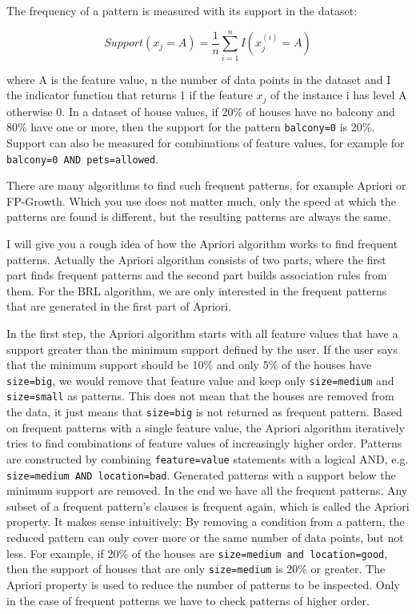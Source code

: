 \documentclass[12pt,]{krantz}
\begin{document}
The frequency of a pattern is measured with its support in the dataset:

\[Support(x_j=A)=\frac{1}n{}\sum_{i=1}^nI(x^{(i)}_{j}=A)\]

where A is the feature value, n the number of data points in the dataset
and I the indicator function that returns 1 if the feature \(x_j\) of
the instance i has level A otherwise 0. In a dataset of house values, if
20\% of houses have no balcony and 80\% have one or more, then the
support for the pattern \texttt{balcony=0} is 20\%. Support can also be
measured for combinations of feature values, for example for
\texttt{balcony=0\ AND\ pets=allowed}.

There are many algorithms to find such frequent patterns, for example
Apriori or FP-Growth. Which you use does not matter much, only the speed
at which the patterns are found is different, but the resulting patterns
are always the same.

I will give you a rough idea of how the Apriori algorithm works to find
frequent patterns. Actually the Apriori algorithm consists of two parts,
where the first part finds frequent patterns and the second part builds
association rules from them. For the BRL algorithm, we are only
interested in the frequent patterns that are generated in the first part
of Apriori.

In the first step, the Apriori algorithm starts with all feature values
that have a support greater than the minimum support defined by the
user. If the user says that the minimum support should be 10\% and only
5\% of the houses have \texttt{size=big}, we would remove that feature
value and keep only \texttt{size=medium} and \texttt{size=small} as
patterns. This does not mean that the houses are removed from the data,
it just means that \texttt{size=big} is not returned as frequent
pattern. Based on frequent patterns with a single feature value, the
Apriori algorithm iteratively tries to find combinations of feature
values of increasingly higher order. Patterns are constructed by
combining \texttt{feature=value} statements with a logical AND, e.g.
\texttt{size=medium\ AND\ location=bad}. Generated patterns with a
support below the minimum support are removed. In the end we have all
the frequent patterns. Any subset of a frequent pattern's clauses is
frequent again, which is called the Apriori property. It makes sense
intuitively: By removing a condition from a pattern, the reduced pattern
can only cover more or the same number of data points, but not less. For
example, if 20\% of the houses are
\texttt{size=medium\ and\ location=good}, then the support of houses
that are only \texttt{size=medium} is 20\% or greater. The Apriori
property is used to reduce the number of patterns to be inspected. Only
in the case of frequent patterns we have to check patterns of higher
order.
\end{document}
